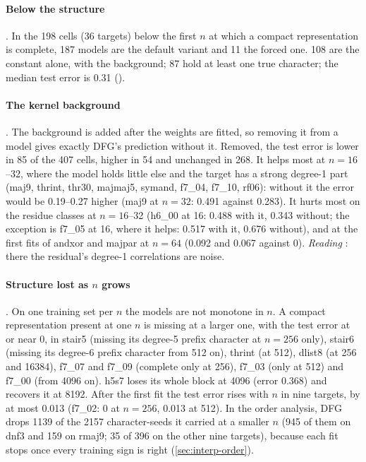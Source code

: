\paragraph{Below the structure} . In the 198 cells (36 targets) below the first $n$ at which a compact representation is complete, 187 models are the default variant and 11 the forced one. 108 are the constant alone, with the background; 87 hold at least one true character; the median test error is 0.31 ().

\paragraph{The kernel background} . The background is added after the weights are fitted, so removing it from a model gives exactly DFG's prediction without it. Removed, the test error is lower in 85 of the 407 cells, higher in 54 and unchanged in 268. It helps most at $n=16$--32, where the model holds little else and the target has a strong degree-1 part (maj9, thrint, thr30, majmaj5, symand, f7\_04, f7\_10, rf06): without it the error would be 0.19--0.27 higher (maj9 at $n=32$: 0.491 against 0.283). It hurts most on the residue classes at $n=16$--32 (h6\_00 at 16: 0.488 with it, 0.343 without; the exception is f7\_05 at 16, where it helps: 0.517 with it, 0.676 without), and at the first fits of andxor and majpar at $n=64$ (0.092 and 0.067 against 0). \emph{Reading} : there the residual's degree-1 correlations are noise.

\paragraph{Structure lost as $n$ grows} . On one training set per $n$ the models are not monotone in $n$. A compact representation present at one $n$ is missing at a larger one, with the test error at or near 0, in stair5 (missing its degree-5 prefix character at $n=256$ only), stair6 (missing its degree-6 prefix character from 512 on), thrint (at 512), dlist8 (at 256 and 16384), f7\_07 and f7\_09 (complete only at 256), f7\_03 (only at 512) and f7\_00 (from 4096 on). h5s7 loses its whole block at 4096 (error 0.368) and recovers it at 8192. After the first fit the test error rises with $n$ in nine targets, by at most 0.013 (f7\_02: 0 at $n=256$, 0.013 at 512). In the order analysis, DFG drops 1139 of the 2157 character-seeds it carried at a smaller $n$ (945 of them on dnf3 and 159 on rmaj9; 35 of 396 on the other nine targets), because each fit stops once every training sign is right (\cref{sec:interp-order}).

